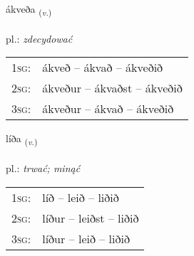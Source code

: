 \documentclass[frontgrid, backgrid]{flacards}\usepackage[]{graphicx}\usepackage[]{xcolor}
\begin{document}
\renewcommand{\blhead}{\vskip5pt {\small\bfseries\footnotesize Sagnorð | Verb }}
\renewcommand{\bcfoot}{\vskip5pt \hspace{2pt}{\small\bfseries\footnotesize 1K}}


{ákveða \small{\textsubscript{(\textit{v.})}} \\[1ex] %
\textphonetic{[auːkʰvɛða]} \\
pl.: \emph{zdecydować} \\  [2ex]
\renewcommand*{\arraystretch}{0.8}
\begin{tabular}{p{1cm}l}
\textsc{1sg}: & ákveð -- ákvað -- ákveðið \\ 
\textsc{2sg}: & ákveður -- ákvaðst -- ákveðið \\ 
\textsc{3sg}: & ákveður -- ákvað -- ákveðið \\ 
\end{tabular}
}

\renewcommand{\flhead}{\vskip5pt \fboxsep=0pt {\small\bfseries\footnotesize Sagnorð | Verb}}
\renewcommand{\fcfoot}{\vskip5pt \fboxsep=0pt \hspace{2pt}{\small\bfseries\footnotesize 1K}}

\renewcommand{\blhead}{\vskip5pt {\small\bfseries\footnotesize Sagnorð | Verb }}
\renewcommand{\bcfoot}{\vskip5pt \hspace{2pt}{\small\bfseries\footnotesize 1K}}


{líða \small{\textsubscript{(\textit{v.})}} \\[1ex] %
\textphonetic{[liːða]} \\
pl.: \emph{trwać; minąć} \\  [2ex]
\renewcommand*{\arraystretch}{0.8}
\begin{tabular}{p{1cm}l}
\textsc{1sg}: & líð -- leið -- liðið \\ 
\textsc{2sg}: & líður -- leiðst -- liðið \\ 
\textsc{3sg}: & líður -- leið -- liðið \\ 
\end{tabular}
}
\end{document}
